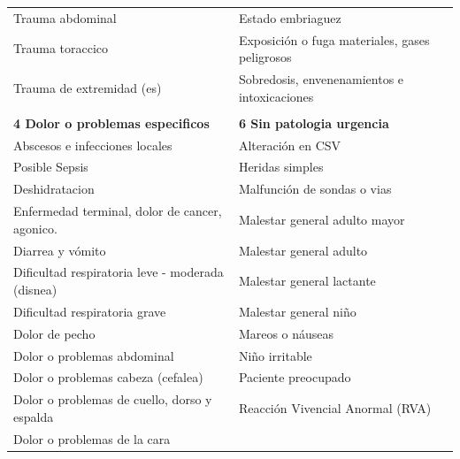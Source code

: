 \documentclass{article}
\begin{document}
\begin{minipage}{\linewidth}
\begin{table}[H]
\begin{tabular}{ll}
Trauma abdominal                                           & Estado embriaguez                                 \\
Trauma toraccico                                           & Exposición o fuga materiales, gases peligrosos    \\
Trauma de extremidad (es)                                  & Sobredosis, envenenamientos e intoxicaciones      \\
                                                           &                                                   \\
\textbf{4 Dolor o problemas especificos}                   & \textbf{6 Sin patologia urgencia}                 \\
Abscesos e infecciones locales                             & Alteración en CSV                                 \\
Posible Sepsis                                             & Heridas simples                                   \\
Deshidratacion                                             & Malfunción de sondas o vias                       \\
Enfermedad terminal, dolor de cancer, agonico.             & Malestar general adulto mayor                     \\
Diarrea y vómito                                           & Malestar general adulto                           \\
Dificultad respiratoria leve - moderada (disnea)           & Malestar general lactante                         \\
Dificultad respiratoria grave                              & Malestar general niño                             \\
Dolor de pecho                                             & Mareos o náuseas                                  \\
Dolor o problemas abdominal                                & Niño irritable                                    \\
Dolor o problemas cabeza (cefalea)                         & Paciente preocupado                               \\
Dolor o problemas de cuello, dorso y espalda               & Reacción Vivencial Anormal (RVA)                  \\
Dolor o problemas de la cara                               &                                                   \\

\end{tabular}
\end{table}
\end{minipage}
\end{document}
